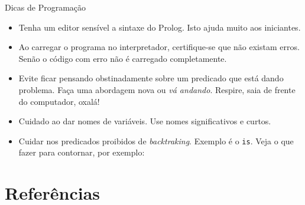 \documentclass[sans]{beamer}
\begin{document}
\begin{frame}
\begin{block}{Dicas de Programação}
\begin{itemize}

\item Tenha um editor sensível a sintaxe do Prolog. Isto ajuda
muito aos iniciantes.

\item Ao carregar o programa no interpretador, certifique-se
que não existam erros. Senão o código com erro não é carregado completamente.

\item Evite ficar pensando obstinadamente sobre um predicado
que está dando problema. Faça uma abordagem nova ou {\em vá andando}.
Respire, saia de frente do computador, oxalá!

\item Cuidado ao dar nomes de variáveis. Use nomes significativos
e curtos.

\item Cuidar nos predicados proibidos de {\em backtraking}. Exemplo
é o {\tt is}. Veja o que fazer para contornar, por exemplo:

\end{itemize}



\end{block}
\end{frame}





\section{Referências}
\end{document}
